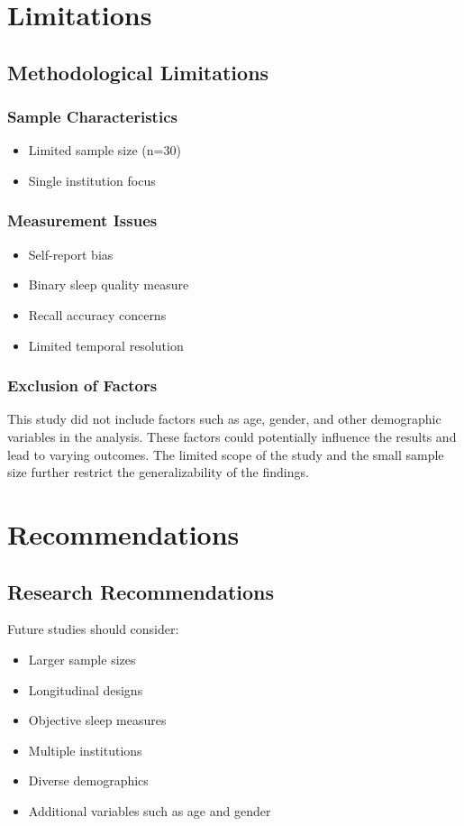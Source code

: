 \documentclass[conference]{IEEEtran}
\begin{document}
\section{Limitations}
\subsection{Methodological Limitations}
\subsubsection{Sample Characteristics}
\begin{itemize}
\item Limited sample size (n=30)
\item Single institution focus
\end{itemize}

\subsubsection{Measurement Issues}
\begin{itemize}
\item Self-report bias
\item Binary sleep quality measure
\item Recall accuracy concerns
\item Limited temporal resolution
\end{itemize}

\subsubsection{Exclusion of Factors}
This study did not include factors such as age, gender, and other demographic variables in the analysis. These factors could potentially influence the results and lead to varying outcomes. The limited scope of the study and the small sample size further restrict the generalizability of the findings.

\section{Recommendations}
\subsection{Research Recommendations}
Future studies should consider:
\begin{itemize}
\item Larger sample sizes
\item Longitudinal designs
\item Objective sleep measures
\item Multiple institutions
\item Diverse demographics
\item Additional variables such as age and gender
\end{itemize}
\end{document}

